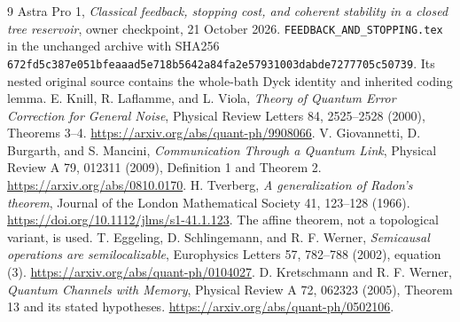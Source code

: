 \documentclass[11pt]{article}
\begin{document}
\begin{thebibliography}{9}\footnotesize\setlength{\itemsep}{1pt}\setlength{\parskip}{0pt}
 Astra Pro 1, \emph{Classical feedback, stopping cost, and coherent stability in a closed tree reservoir}, owner checkpoint, 21 October 2026. \texttt{FEEDBACK\_AND\_STOPPING.tex} in the unchanged archive with SHA256 \texttt{672fd5c387e051bfeaaad5e718b5642a84fa2e57931003dabde7277705c50739}. Its nested original source contains the whole-bath Dyck identity and inherited coding lemma.
 E. Knill, R. Laflamme, and L. Viola, \emph{Theory of Quantum Error Correction for General Noise}, Physical Review Letters 84, 2525--2528 (2000), Theorems 3--4. \url{https://arxiv.org/abs/quant-ph/9908066}.
 V. Giovannetti, D. Burgarth, and S. Mancini, \emph{Communication Through a Quantum Link}, Physical Review A 79, 012311 (2009), Definition 1 and Theorem 2. \url{https://arxiv.org/abs/0810.0170}.
 H. Tverberg, \emph{A generalization of Radon's theorem}, Journal of the London Mathematical Society 41, 123--128 (1966). \url{https://doi.org/10.1112/jlms/s1-41.1.123}. The affine theorem, not a topological variant, is used.
 T. Eggeling, D. Schlingemann, and R. F. Werner, \emph{Semicausal operations are semilocalizable}, Europhysics Letters 57, 782--788 (2002), equation (3). \url{https://arxiv.org/abs/quant-ph/0104027}.
 D. Kretschmann and R. F. Werner, \emph{Quantum Channels with Memory}, Physical Review A 72, 062323 (2005), Theorem 13 and its stated hypotheses. \url{https://arxiv.org/abs/quant-ph/0502106}.
\end{thebibliography}
\end{document}

